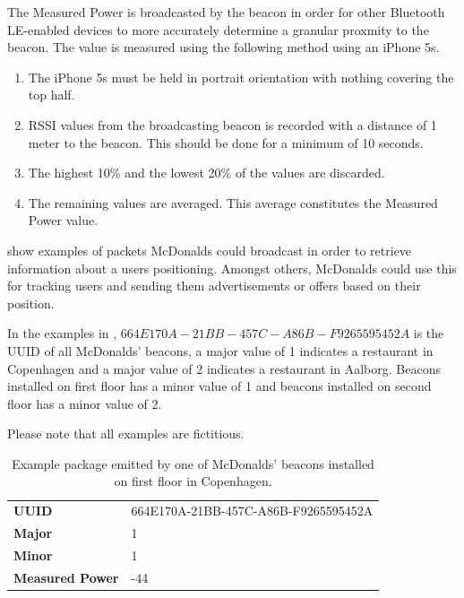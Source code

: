 The Measured Power is broadcasted by the beacon in order for other Bluetooth LE-enabled devices to more accurately determine a granular proxmity to the beacon. The value is measured using the following method \cite{apple:proximity-beacon-spec} using an iPhone 5s.

\begin{enumerate}
\item The iPhone 5s must be held in portrait orientation with nothing covering the top half.
\item RSSI values from the broadcasting beacon is recorded with a distance of 1 meter to the beacon. This should be done for a minimum of 10 seconds.
\item The highest 10\% and the lowest 20\% of the values are discarded.
\item The remaining values are averaged. This average constitutes the Measured Power value.
\end{enumerate}

 show examples of packets McDonalds could broadcast in order to retrieve information about a users positioning. Amongst others, McDonalds could use this for tracking users and sending them advertisements or offers based on their position.

In the examples in , $664E170A-21BB-457C-A86B-F9265595452A$ is the UUID of all McDonalds' beacons, a major value of 1 indicates a restaurant in Copenhagen and a major value of 2 indicates a restaurant in Aalborg. Beacons installed on first floor has a minor value of 1 and beacons installed on second floor has a minor value of 2.

Please note that all examples are fictitious.

\begin{table}[h!]
\centering
\caption{Example package emitted by one of McDonalds' beacons installed on first floor in Copenhagen.}
\label{tbl:design:ble-positioning:ibeacon1}
\begin{tabular}{ll}
\textbf{UUID}  & 664E170A-21BB-457C-A86B-F9265595452A \\
\textbf{Major} & 1                                    \\
\textbf{Minor} & 1            \\                        
\textbf{Measured Power} & -44
\end{tabular}
\end{table}

